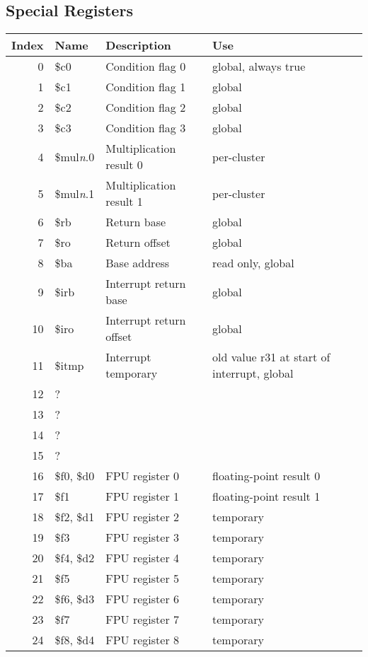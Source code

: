 \documentclass[10pt,DIV12]{scrartcl}
\begin{document}
\subsection{Special Registers}

\begin{tabular}{rlll}
  \toprule
  Index & Name & Description & Use \\
  \midrule
  0 & \$c0 & Condition flag 0 & global, always true \\
  1 & \$c1 & Condition flag 1 & global \\
  2 & \$c2 & Condition flag 2 & global \\
  3 & \$c3 & Condition flag 3 & global \\
  \cmidrule{1-4}
  4 & \$mul\textit{n}.0 & Multiplication result 0 & per-cluster \\
  5 & \$mul\textit{n}.1 & Multiplication result 1 & per-cluster \\
  \cmidrule{1-4}
  6 & \$rb & Return base & global \\
  7 & \$ro & Return offset & global \\
  8 & \$ba & Base address & read only, global \\
  \cmidrule{1-4}
  9 & \$irb & Interrupt return base & global \\
  10 & \$iro & Interrupt return offset & global  \\
  11 & \$itmp & Interrupt temporary & old value r31 at start of interrupt, global \\
  \cmidrule{1-4}
  12 & ? & & \\
  13 & ? & & \\
  14 & ? & & \\
  15 & ? & & \\
  \cmidrule{1-4}
  16 & \$f0, \$d0 & FPU register 0 & floating-point result 0 \\
  17 & \$f1 & FPU register 1       & floating-point result 1 \\
  18 & \$f2, \$d1 & FPU register 2 & temporary \\
  19 & \$f3 & FPU register 3       & temporary \\
  20 & \$f4, \$d2 & FPU register 4 & temporary \\
  21 & \$f5 & FPU register 5       & temporary \\
  22 & \$f6, \$d3 & FPU register 6 & temporary \\
  23 & \$f7 & FPU register 7       & temporary \\
  24 & \$f8, \$d4 & FPU register 8 & temporary \\

\end{tabular}
\end{document}
